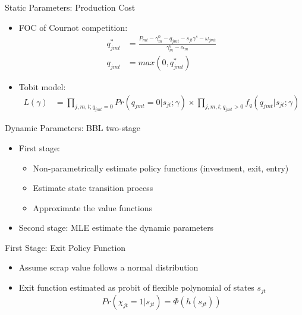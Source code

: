 \documentclass[xcolor=dvipsnames,envcountsect]{beamer}
\begin{document}
 \begin{frame}{Static Parameters: Production Cost}
\begin{itemize}   
    \item FOC of Cournot competition:
    \begin{align}
        q_{jmt}^*&=\frac{P_{mt}-\gamma_m^0-q_{jmt}-s_{jt}\gamma^s-\omega_{jmt}}{\gamma_m^q-\alpha_m} \nonumber \\
        q_{jmt}&=max(0,q_{jmt}^*)
    \end{align}
    \pause
    \item Tobit model:
    \begin{align}
    L(\gamma)&=\prod_{j,m,t;q_{jmt}=0} Pr(q_{jmt}=0|s_{jt};\gamma)\times\prod_{j,m,t;q_{jmt}>0} f_{q}(q_{jmt}|s_{jt};\gamma)
    \end{align}

\end{itemize}
\end{frame}

\begin{frame}{Dynamic Parameters: BBL two-stage}

\begin{itemize}
    \item First stage: 
        \begin{itemize}
        \item Non-parametrically estimate policy functions (investment, exit, entry)
        \item Estimate state transition process
        \item Approximate the value functions
        \end{itemize}
    \item Second stage: MLE estimate the dynamic parameters

\end{itemize}


\end{frame}
\begin{frame}{First Stage: Exit Policy Function}
\begin{itemize}
    \item Assume scrap value follows a normal  distribution
    \item Exit function estimated as probit of flexible polynomial of states $s_{jt}$
    \begin{equation}
        Pr(\chi_{jt}=1|s_{jt})=\Phi(h(s_{jt}))
    \end{equation}

    \end{itemize}
\end{frame}
\end{document}
